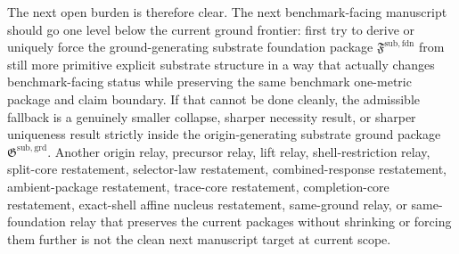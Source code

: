 \documentclass[11pt]{article}
\newcommand{\GroundPackage}{\mathfrak G^{\mathrm{sub,grd}}}
\newcommand{\FoundationPackage}{\mathfrak F^{\mathrm{sub,fdn}}}
\begin{document}
The next open burden is therefore clear. The next benchmark-facing manuscript should go one level below the current ground frontier: first try to derive or uniquely force the ground-generating substrate foundation package \(\FoundationPackage\) from still more primitive explicit substrate structure in a way that actually changes benchmark-facing status while preserving the same benchmark one-metric package and claim boundary. If that cannot be done cleanly, the admissible fallback is a genuinely smaller collapse, sharper necessity result, or sharper uniqueness result strictly inside the origin-generating substrate ground package \(\GroundPackage\). Another origin relay, precursor relay, lift relay, shell-restriction relay, split-core restatement, selector-law restatement, combined-response restatement, ambient-package restatement, trace-core restatement, completion-core restatement, exact-shell affine nucleus restatement, same-ground relay, or same-foundation relay that preserves the current packages without shrinking or forcing them further is not the clean next manuscript target at current scope.
\end{document}
